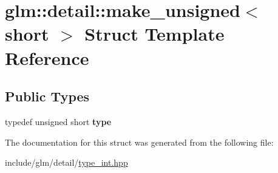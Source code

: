 \hypertarget{structglm_1_1detail_1_1make__unsigned_3_01short_01_4}{}\section{glm\+:\+:detail\+:\+:make\+\_\+unsigned$<$ short $>$ Struct Template Reference}
\label{structglm_1_1detail_1_1make__unsigned_3_01short_01_4}
\subsection*{Public Types}
\begin{DoxyCompactItemize}
\item 
\mbox{\label{structglm_1_1detail_1_1make__unsigned_3_01short_01_4_a58861091aca3a68acc085131cc6fefa4}} 
typedef unsigned short {\bfseries type}
\end{DoxyCompactItemize}


The documentation for this struct was generated from the following file\+:\begin{DoxyCompactItemize}
\item 
include/glm/detail/\hyperlink{type__int_8hpp}{type\+\_\+int.\+hpp}\end{DoxyCompactItemize}
